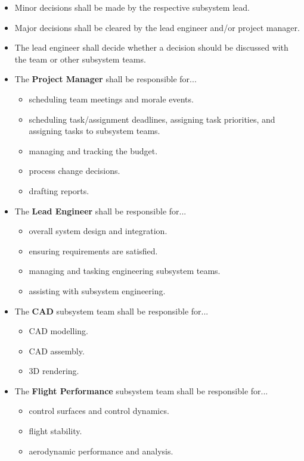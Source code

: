 \begin{itemize}
    \item Minor decisions shall be made by the respective subsystem lead.
    \item Major decisions shall be cleared by the lead engineer and/or project manager.
    \item The lead engineer shall decide whether a decision should be discussed with the team or other subsystem teams.
    \item The \textbf{Project Manager} shall be responsible for...
    \begin{itemize}
        \item scheduling team meetings and morale events.
        \item scheduling task/assignment deadlines, assigning task priorities, and assigning tasks to subsystem teams.
        \item managing and tracking the budget.
        \item process change decisions.
        \item drafting reports.
    \end{itemize}
    \item The \textbf{Lead Engineer} shall be responsible for...
    \begin{itemize}
        \item overall system design and integration.
        \item ensuring requirements are satisfied.
        \item managing and tasking engineering subsystem teams.
        \item assisting with subsystem engineering.
    \end{itemize}
    \item The \textbf{CAD} subsystem team shall be responsible for...
    \begin{itemize}
        \item CAD modelling.
        \item CAD assembly.
        \item 3D rendering.
    \end{itemize}
    \item The \textbf{Flight Performance} subsystem team shall be responsible for...
    \begin{itemize}
        \item control surfaces and control dynamics.
        \item flight stability.
        \item aerodynamic performance and analysis.

\end{itemize}
\end{itemize}
